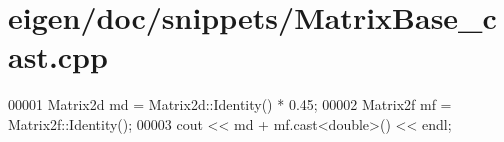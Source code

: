 \hypertarget{eigen_2doc_2snippets_2_matrix_base__cast_8cpp_source}{}\section{eigen/doc/snippets/\+Matrix\+Base\+\_\+cast.cpp}
\label{eigen_2doc_2snippets_2_matrix_base__cast_8cpp_source}

\begin{DoxyCode}
00001 Matrix2d md = Matrix2d::Identity() * 0.45;
00002 Matrix2f mf = Matrix2f::Identity();
00003 cout << md + mf.cast<\textcolor{keywordtype}{double}>() << endl;
\end{DoxyCode}

